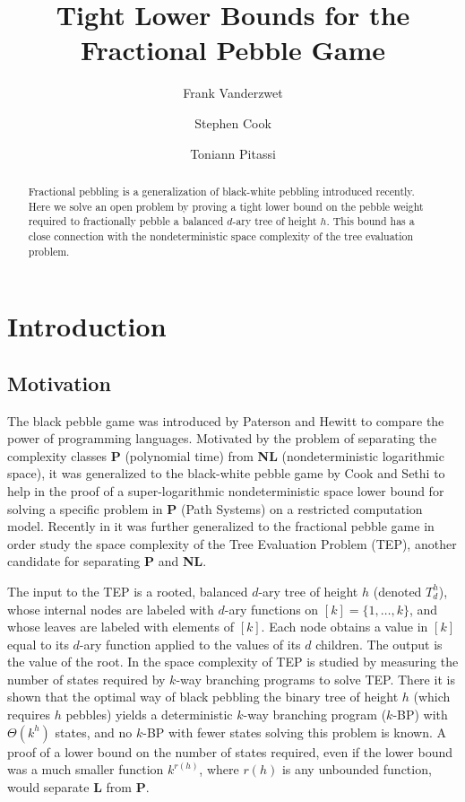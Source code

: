 \documentclass[oribib1]{llncs}
\begin{document}
\title{Tight Lower Bounds for the Fractional Pebble Game}
\author{Frank Vanderzwet \and
Stephen Cook \and
Toniann Pitassi}

\maketitle
\begin{abstract}
Fractional pebbling is a generalization of black-white pebbling
introduced recently.  Here we solve an open problem by proving a
tight lower bound on the pebble weight required to fractionally
pebble a balanced $d$-ary tree of height $h$.  This bound has a
close connection with the nondeterministic space complexity
of the tree evaluation problem.
\end{abstract}



\section{Introduction} 

\subsection{Motivation}

The black pebble game was introduced by Paterson and Hewitt \cite{ph:comsc}
to compare the power of programming languages.
Motivated by the problem of separating the complexity classes
{\bf P} (polynomial time) from {\bf NL} (nondeterministic logarithmic
space), it was generalized to the black-white pebble game by Cook and Sethi
\cite{cs:pfromnl} to help in the proof of a super-logarithmic
nondeterministic space lower bound for solving a specific problem in
{\bf P} (Path Systems) on a restricted computation model.   Recently
in \cite{c:pebjournal} it was further generalized to the fractional
pebble game in order study the space complexity of the Tree
Evaluation Problem (TEP), another candidate for separating {\bf P}
and {\bf NL}.

The input to the TEP is a rooted, balanced $d$-ary tree of height $h$
(denoted $T^h_d$),
whose internal nodes are labeled with $d$-ary functions
on $[k]=\{1,\ldots,k\}$, and whose leaves are labeled with elements
of $[k]$.  Each node obtains a value in $[k]$ equal to its $d$-ary
function applied to the values of its $d$ children.  The output is the
value of the root.  In \cite{c:pebjournal} the space complexity of
TEP is studied by measuring the number of states required by $k$-way
branching programs to solve TEP.  There it is shown that the
optimal way of black pebbling the binary tree of height $h$ (which
requires $h$ pebbles) yields a deterministic $k$-way branching
program ($k$-BP) with $\Theta(k^h)$ states, and no $k$-BP with fewer
states solving this problem is known.   A proof of a lower bound on
the number of states required, even if the lower bound was a much smaller
function $k^{r(h)}$, where $r(h)$ is any unbounded function, would
separate {\bf L} from {\bf P}.
\end{document}
